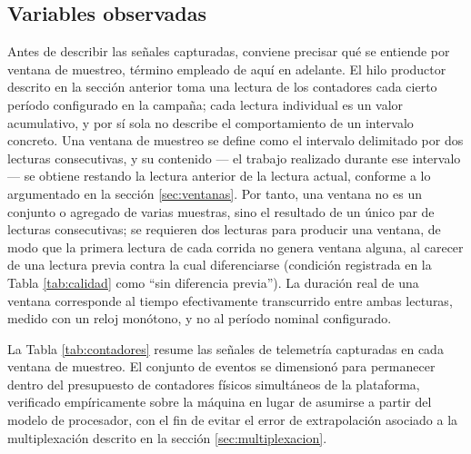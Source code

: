 \documentclass[12pt,oneside,spanish]{book}
\begin{document}
\subsection{Variables observadas}

Antes de describir las señales capturadas, conviene precisar qué se entiende por ventana de muestreo, término empleado de aquí en adelante. El hilo productor descrito en la sección anterior toma una lectura de los contadores cada cierto período configurado en la campaña; cada lectura individual es un valor acumulativo, y por sí sola no describe el comportamiento de un intervalo concreto. Una ventana de muestreo se define como el intervalo delimitado por dos lecturas consecutivas, y su contenido --- el trabajo realizado durante ese intervalo --- se obtiene restando la lectura anterior de la lectura actual, conforme a lo argumentado en la sección \ref{sec:ventanas}. Por tanto, una ventana no es un conjunto o agregado de varias muestras, sino el resultado de un único par de lecturas consecutivas; se requieren dos lecturas para producir una ventana, de modo que la primera lectura de cada corrida no genera ventana alguna, al carecer de una lectura previa contra la cual diferenciarse (condición registrada en la Tabla \ref{tab:calidad} como ``sin diferencia previa''). La duración real de una ventana corresponde al tiempo efectivamente transcurrido entre ambas lecturas, medido con un reloj monótono, y no al período nominal configurado.

La Tabla \ref{tab:contadores} resume las señales de telemetría capturadas en cada ventana de muestreo. El conjunto de eventos se dimensionó para permanecer dentro del presupuesto de contadores físicos simultáneos de la plataforma, verificado empíricamente sobre la máquina en lugar de asumirse a partir del modelo de procesador, con el fin de evitar el error de extrapolación asociado a la multiplexación descrito en la sección \ref{sec:multiplexacion}.
\end{document}
